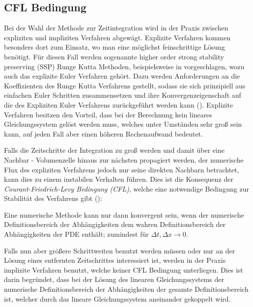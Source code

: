 \subsection{CFL Bedingung}
Bei der Wahl der Methode zur Zeitintegration wird in der Praxis zwischen expliziten und impliziten Verfahren abgewägt. Explizite Verfahren kommen besonders dort zum Einsatz, wo man eine möglichst feinschrittige Lösung benötigt. Für diesen Fall werden sogenannte higher order strong stability preserving (SSP) Runge Kutta Methoden, beispielsweise in \cite{gottlieb2003strong} vorgeschlagen, wozu auch das explizite Euler Verfahren gehört. Dazu werden Anforderungen an die Koeffizienten des Runge Kutta Verfahrens gestellt, sodass sie sich prinzipiell aus einfachen Euler Schritten zusammensetzen und ihre Konvergenzeigenschaft auf die des Expliziten Euler Verfahrens zurückgeführt werden kann (\cite[Lemma 1.1]{gottlieb2003strong}). Explizite Verfahren besitzen den Vorteil, dass bei der Berechnung kein lineares Gleichungssystem gelöst werden muss, welches unter Umständen sehr groß sein kann, auf jeden Fall aber einen höheren Rechenaufwand bedeutet.

Falls die Zeitschritte der Integration zu groß werden und damit über eine Nachbar - Volumenzelle hinaus zur nächsten propagiert werden, der numerische Flux des expliziten Verfahrens jedoch nur seine direkten Nachbarn betrachtet, kann dies zu einem instabilen Verhalten führen. Dies ist die Konsequenz der \textit{Courant-Friedrich-Levy Bedingung (CFL)}, welche eine notwendige Bedingung zur Stabilität des Verfahrens gibt (\cite[S.69]{leveque2002finite}):
\begin{theorem*}
  Eine numerische Methode kann nur dann konvergent sein, wenn der numerische Definitionsbereich der Abhängigkeiten dem wahren Definitionsbereich der Abhängigkeiten der PDE enthält; zumindest für $\Delta t, \Delta x\to 0$.
\end{theorem*}

Falls nun aber größere Schrittweiten benutzt werden müssen oder nur an der Lösung eines entfernten Zeitschrittes interessiert ist, werden in der Praxis implizite Verfahren benutzt, welche keiner CFL Bedingung unterliegen. Dies ist darin begründet, dass bei der Lösung des linearen Gleichungssystems der numerische Definitionsbereich der Abhängigkeiten der gesamte Definitionsbereich ist, welcher durch das lineare Gleichungssystem aneinander gekoppelt wird.

